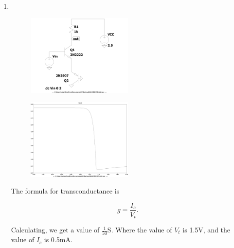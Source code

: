 \documentclass{zc-ust-hw}
\begin{document}
\maketitle

\begin{enumerate}
  \item \,
    \begin{figure}[h]
      \centering
      \includegraphics[width=0.5\textwidth]{figures/1-dc-circuit.pdf}
      \caption{}
    \end{figure}
    \begin{figure}[h]
      \centering
      \includegraphics[width=0.5\textwidth]{figures/1-dc-graph.pdf}
      \caption{}
    \end{figure}

    The formula for transconductance is

    \[
      g=\frac{I_{c}}{V_{t}}
    .\]

    Calculating, we get a value of \( \frac{1}{50} \)S. Where the value of \(
    V_{t} \) is 1.5V, and the value of \( I_{c} \) is 0.5mA.

    \newpage


\end{enumerate}
\end{document}
